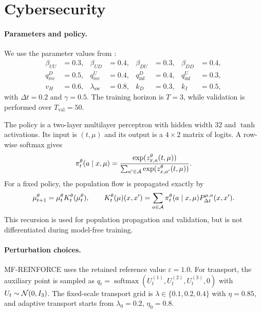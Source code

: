 \section{Cybersecurity}
\label{appendix:spec-cybersecurity}

\paragraph{Parameters and policy.}
We use the parameter values from \cite{meunier2026model}:
\begin{align}
    \beta_{UU}&=0.3,&
    \beta_{UD}&=0.4,&
    \beta_{DU}&=0.3,&
    \beta_{DD}&=0.4,\\
    q_{\mathrm{rec}}^D&=0.5,&
    q_{\mathrm{rec}}^U&=0.4,&
    q_{\mathrm{inf}}^D&=0.4,&
    q_{\mathrm{inf}}^U&=0.3,\\
    v_H&=0.6,&
    \lambda_{\mathrm{sw}}&=0.8,&
    k_D&=0.3,&
    k_I&=0.5,
\end{align}
with $\Delta t=0.2$ and $\gamma=0.5$. The training horizon is $T=3$, while validation is performed over $T_{\mathrm{val}}=50$.

The policy is a two-layer multilayer perceptron with hidden width $32$ and $\tanh$ activations. Its input is $(t,\mu)$ and its output is a $4\times2$ matrix of logits. A row-wise softmax gives
\begin{align}
    \pi_t^\theta(a\mid x,\mu)
    =
    \frac{\exp(z_{x,a}^\theta(t,\mu))}
    {\sum_{a'\in{\cal A}}\exp(z_{x,a'}^\theta(t,\mu))}.
\end{align}
For a fixed policy, the population flow is propagated exactly by
\begin{align}
    \mu_{t+1}^\theta
    =
    \mu_t^\theta K_t^\theta(\mu_t^\theta),
    \qquad
    K_t^\theta(\mu)(x,x')
    =
    \sum_{a\in{\cal A}}\pi_t^\theta(a\mid x,\mu)P_{\Delta t}^{\mu,a}(x,x').
\end{align}
This recursion is used for population propagation and validation, but is not differentiated during model-free training.

\paragraph{Perturbation choices.}
MF-REINFORCE uses the retained reference value $\varepsilon=1.0$. For transport, the auxiliary point is sampled as $q_t=\operatorname{softmax}(U_t^{(1)},U_t^{(2)},U_t^{(3)},0)$ with $U_t\sim{\cal N}(0,I_3)$. The fixed-scale transport grid is $\lambda\in\{0.1,0.2,0.4\}$ with $\eta=0.85$, and adaptive transport starts from $\lambda_0=0.2$, $\eta_0=0.8$.

